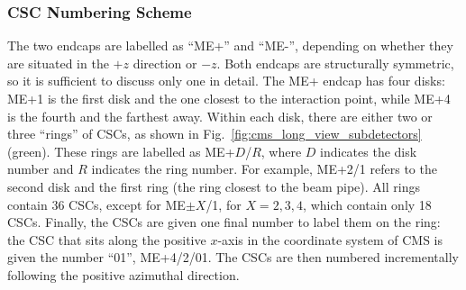 





\subsubsection{CSC Numbering Scheme}
\label{sec:csc_numbering}
The two endcaps are labelled as ``ME+'' and ``ME-'', depending on whether they are situated in the $+z$ direction or $-z$.
Both endcaps are structurally symmetric, so it is sufficient to discuss only one in detail.
The ME+ endcap has four disks: ME+1 is the first disk and the one closest to the interaction point, while ME+4 is the fourth and the farthest away. 
Within each disk, there are either two or three ``rings'' of CSCs, as shown in Fig.~\ref{fig:cms_long_view_subdetectors} (green).
These rings are labelled as ME+$D$/$R$, where $D$ indicates the disk number and $R$ indicates the ring number.
For example, ME+2/1 refers to the second disk and the first ring (the ring closest to the beam pipe).
All rings contain 36 CSCs, except for ME$\pm X$/1, for $X= 2,3,4$, which contain only 18 CSCs.
Finally, the CSCs are given one final number to label them on the ring:
the CSC that sits along the positive $x$-axis in the coordinate system of CMS is given the number ``01'', \eg ME+4/2/01. 
The CSCs are then numbered incrementally following the positive azimuthal direction.

